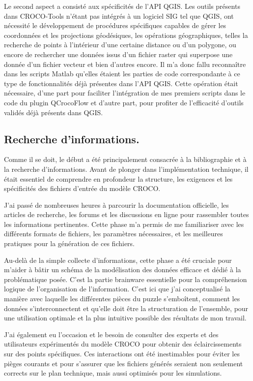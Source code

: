 Le second aspect a consisté aux spécificités de l'API QGIS. Les outils présents dans \og CROCO-Tools \fg{} n'étant pas intégrés à un logiciel SIG tel que QGIS, ont nécessité le développement de procédures spécifiques capables de gérer les coordonnées et les projections géodésiques, les opérations géographiques, telles la recherche de points à l'intérieur d'une certaine distance ou d'un polygone, ou encore de rechercher une données issus d'un fichier raster qui superpose une donnée d'un fichier vecteur et bien d'autres encore. Il m'a donc fallu reconnaître dans les scripts Matlab qu'elles étaient les parties de code correspondante à ce type de fonctionnalités déjà présentes dans l'API QGIS. Cette opération était nécessaire, d'une part pour faciliter l'intégration de mes premiers scripts dans le code du plugin QCrocoFlow et d'autre part, pour profiter de l'efficacité d'outils validés déjà présents dans QGIS.

\subsection{Recherche d'informations.}

Comme il se doit, le début a été principalement consacrée à la bibliographie et à la recherche d'informations. Avant de plonger dans l'implémentation technique, il était essentiel de comprendre en profondeur la structure, les exigences et les spécificités des fichiers d'entrée du modèle CROCO.

J'ai passé de nombreuses heures à parcourir la documentation officielle, les articles de recherche, les forums et les discussions en ligne pour rassembler toutes les informations pertinentes. Cette phase m'a permis de me familiariser avec les différents formats de fichiers, les paramètres nécessaires, et les meilleures pratiques pour la génération de ces fichiers.

Au-delà de la simple collecte d'informations, cette phase a été cruciale pour m'aider à bâtir un schéma de la modélisation des données efficace et dédié à la problématique posée. C'est la partie \og brainware \fg{} essentielle pour la compréhension logique de l'organisation de l'information. C'est ici que j'ai conceptualisé la manière avec laquelle les différentes pièces du puzzle s'emboîtent, comment les données s'interconnectent et qu'elle doit être la structuration de l'ensemble, pour une utilisation optimale et la plus intuitive possible des résultats de mon travail.

J'ai également eu l'occasion et le besoin de consulter des experts et des utilisateurs expérimentés du modèle CROCO pour obtenir des éclaircissements sur des points spécifiques. Ces interactions ont été inestimables pour éviter les pièges courants et pour s'assurer que les fichiers générés seraient non seulement corrects sur le plan technique, mais aussi optimisés pour les simulations.\\

